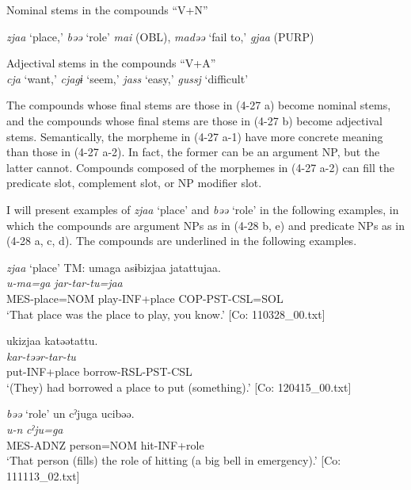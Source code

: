 \ea \label{ex:4.27}
\ea Nominal stems in the compounds “V+N” \label{ex:4.27a}
\begin{xlisti} \ex  \textit{zjaa} ‘place,’ \textit{bəə} ‘role’
\ex \textit{mai} (OBL), \textit{madəə} ‘fail to,’ \textit{gjaa} (PURP)
\end{xlisti}
\ex Adjectival stems in the compounds “V+A”\\\label{ex:4.27b}
    \textit{cja} ‘want,’ \textit{cjagɨ} ‘seem,’ \textit{jass} ‘easy,’ \textit{gussj} ‘difficult’
\z
\z  

The compounds whose final stems are those in (4-27 a) become nominal stems, and the compounds whose final stems are those in (4-27 b) become adjectival stems. Semantically, the morpheme in (4-27 a-1) have more concrete meaning than those in (4-27 a-2). In fact, the former can be an argument NP, but the latter cannot. Compounds composed of the morphemes in (4-27 a-2) can fill the predicate slot, complement slot, or NP modifier slot.

I will present examples of \textit{zjaa} ‘place’ and \textit{bəə} ‘role’ in the following examples, in which the compounds are argument NPs as in (4-28 b, e) and predicate NPs as in (4-28 a, c, d). The compounds are underlined in the following examples.

\ea  \textit{zjaa} ‘place’ \label{ex:4.28}
\ea\label{ex:4.28a}
\glll  TM:  umaga  asɨbizjaa  jatattujaa.\\
      \textit{u-ma=ga}  \textit{}  \textit{jar-tar-tu=jaa}\\
      MES-place=NOM  play-INF+place  COP-PST-CSL=SOL\\
      \glt       ‘That place was the place to play, you know.’ [Co: 110328\_00.txt]

\ex\label{ex:4.28b}
  \glll  ukizjaa  katəətattu.\\
      \textit{}  \textit{kar-təər-tar-tu}\\
      put-INF+place  borrow-RSL-PST-CSL\\
      \glt       ‘(They) had borrowed a place to put (something).’ [Co: 120415\_00.txt]

\exi{} \textit{bəə} ‘role’
\ex\label{ex:4.28c}
\glll  un  cˀjuga  ucibəə.\\
      \textit{u-n}  \textit{cˀju=ga}  \textit{}\\
      MES-ADNZ  person=NOM  hit-INF+role\\
      \glt       ‘That person (fills) the role of hitting (a big bell in emergency).’ [Co: 111113\_02.txt]


